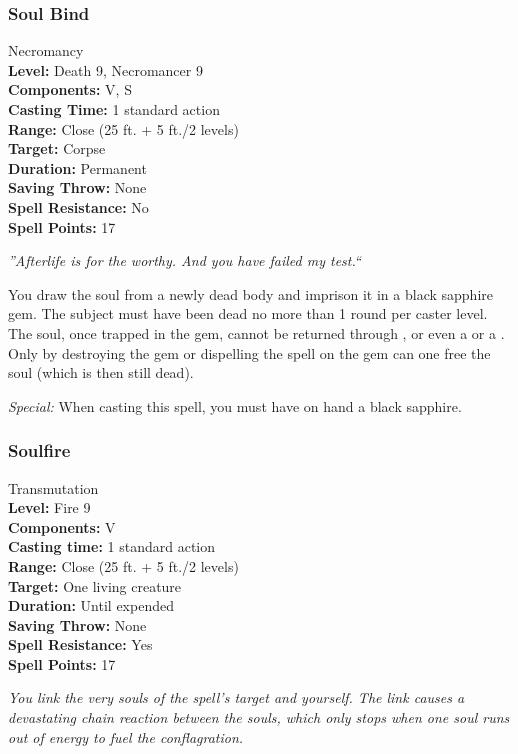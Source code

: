 \subsubsection{Soul Bind}
\label{Spell:SoulBind}
Necromancy
\\ \textbf{Level:} Death 9, Necromancer 9
\\ \textbf{Components:} V, S
\\ \textbf{Casting Time:} 1 standard action
\\ \textbf{Range:} Close (25 ft. + 5 ft./2 levels)
\\ \textbf{Target:} Corpse
\\ \textbf{Duration:} Permanent
\\ \textbf{Saving Throw:} None
\\ \textbf{Spell Resistance:} No
\\ \textbf{Spell Points:} 17

\emph{''Afterlife is for the worthy. And you have failed my test.``}

You draw the soul from a newly dead body and imprison it in a black sapphire gem. 
The subject must have been dead no more than 1 round per caster level. 
The soul, once trapped in the gem, cannot be returned through ,  or even a  or a . 
Only by destroying the gem or dispelling the spell on the gem can one free the soul (which is then still dead).

 \emph{Special:} When casting this spell, you must have on hand a black sapphire.
\subsubsection{Soulfire}
\label{Spell:Soulfire}
Transmutation
\\ \textbf{Level:} Fire 9
\\ \textbf{Components:} V
\\ \textbf{Casting time:} 1 standard action
\\ \textbf{Range:} Close (25 ft. + 5 ft./2 levels)
\\ \textbf{Target:} One living creature
\\ \textbf{Duration:} Until expended
\\ \textbf{Saving Throw:} None
\\ \textbf{Spell Resistance:} Yes
\\ \textbf{Spell Points:} 17

\emph{You link the very souls of the spell's target and yourself. The link causes a devastating chain reaction between the souls, which only stops when one soul runs out of energy to fuel the conflagration.}

